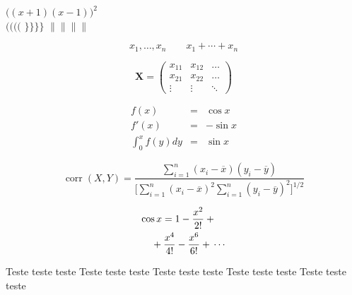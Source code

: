 \documentclass[a4paper,11pt,twocolumn]{article}
\begin{document}
$\Big( (x+1) (x-1) \Big) ^{2}$\\
$\big(\Big(\bigg(\Bigg($\quad
$\big\}\Big\}\bigg\}\Bigg\}$\quad
$\big\|\Big\|\bigg\|\Bigg\|$

\begin{displaymath}
x_{1},\ldots,x_{n} \qquad
x_{1}+\cdots+x_{n}
\end{displaymath}

\begin{displaymath}
\mathbf{X} =
\left( \begin{array}{ccc}
x_{11} & x_{12} & \ldots \\
x_{21} & x_{22} & \ldots \\
\vdots & \vdots & \ddots
\end{array} \right)
\end{displaymath}

\begin{eqnarray}
f(x) &=& \cos x \\
f'(x) &=& -\sin x \\
\int_{0}^{x} f(y)dy &=& \sin x
\end{eqnarray}

\begin{displaymath}
\mathop{\mathrm{corr}}(X,Y)=
\frac{\displaystyle
\sum_{i=1}^n(x_i-\overline x)
(y_i-\overline y)}
{\displaystyle\biggl[
\sum_{i=1}^n(x_i-\overline x)^2
\sum_{i=1}^n(y_i-\overline y)^2
\biggr]^{1/2}}
\end{displaymath}

\begin{eqnarray}
\lefteqn{ \cos x = 1
-\frac{x^{2}}{2!} +{} }
\nonumber\\
& & {}+\frac{x^{4}}{4!}
-\frac{x^{6}}{6!}+{}\cdots
\end{eqnarray}

Teste teste teste Teste teste teste Teste teste teste Teste teste teste Teste teste teste \cite{Pressman:2007}



\end{document}
